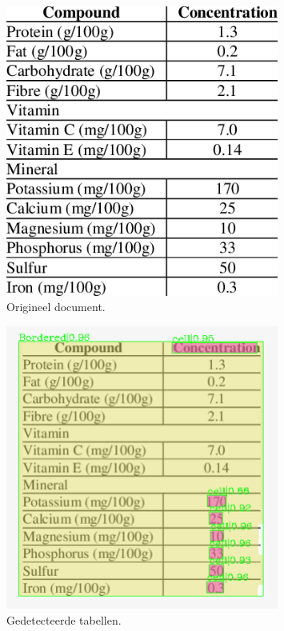 \begin{figure}[H]
    \centering
    \includegraphics[width=0.8\textwidth]{test-resultaten/27/original.png}
    \caption{Origineel document.}
\end{figure}

\begin{figure}[H]
    \centering
    \includegraphics[width=0.8\textwidth]{test-resultaten/27/detected_tables.png}
    \caption{Gedetecteerde tabellen.}
\end{figure}

